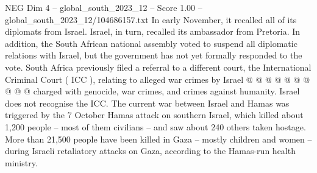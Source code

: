 \begin{textsample}{NEG Dim 4 – global\_south\_2023\_12 – Score 1.00 – global\_south\_2023\_12/104686157.txt}
In early November, it recalled all of its diplomats from Israel.
Israel, in turn, recalled its ambassador from Pretoria.
In addition, the South African national assembly voted to suspend all diplomatic relations with Israel, but the government has not yet formally responded to the vote.
South Africa previously filed a referral to a different court, the International Criminal Court ( ICC ), relating to alleged war crimes by Israel @ @ @ @ @ @ @ @ @ @ charged with genocide, war crimes, and crimes against humanity.
Israel does not recognise the ICC.
The current war between Israel and Hamas was triggered by the 7 October Hamas attack on southern Israel, which killed about 1,200 people -- most of them civilians -- and saw about 240 others taken hostage.
More than 21,500 people have been killed in Gaza -- mostly children and women -- during Israeli retaliatory attacks on Gaza, according to the Hamas-run health ministry.

\end{textsample}
